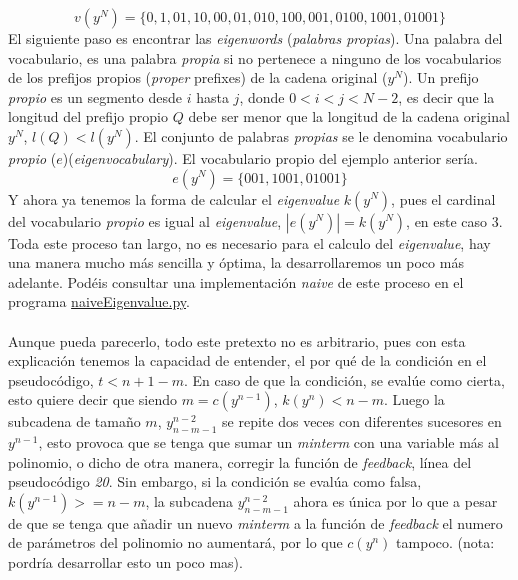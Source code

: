 \[v(y^{N}) = \{0, 1, 01, 10, 00, 01, 010, 100, 001, 0100, 1001, 01001 \}\]
El siguiente paso es encontrar las \textit{eigenwords} (\textit{palabras propias}). Una palabra del vocabulario, es una palabra \textit{propia} si no pertenece a ninguno de los vocabularios de los prefijos propios (\textit{proper} prefixes) de la cadena original ($y^{N}$). Un prefijo \textit{propio} es un segmento desde $i$ hasta $j$, donde $0 < i < j < N-2$, es decir que la longitud del prefijo propio $Q$ debe ser menor que la longitud de la cadena original $y^{N}$, $l(Q) < l(y^{N})$. El conjunto de palabras \textit{propias} se le denomina vocabulario \textit{propio} ($e$)(\textit{eigenvocabulary}). El vocabulario propio del ejemplo anterior sería.
\[e(y^{N}) = \{ 001, 1001, 01001 \}\]
Y ahora ya tenemos la forma de calcular el \textit{eigenvalue} $k(y^N)$, pues el cardinal del vocabulario \textit{propio} es igual al \textit{eigenvalue}, $|e(y^N)| = k(y^N)$, en este caso 3. Toda este proceso tan largo, no es necesario para el calculo del \textit{eigenvalue}, hay una manera mucho más sencilla y óptima, la desarrollaremos un poco más adelante. Podéis consultar una implementación \textit{naive} de este proceso en el programa \href{https://github.com/domingoUnican/TFGPedroCastro/blob/main/code/code_proofs/naive_eigenvalue.py}{naiveEigenvalue.py}.\\\\ Aunque pueda parecerlo, todo este pretexto no es arbitrario, pues con esta explicación tenemos la capacidad de entender, el por qué de la condición en el pseudocódigo, $t < n + 1 - m$. En caso de que la condición, se evalúe como cierta, esto quiere decir que siendo $m = c(y^{n-1})$, $k(y^n) < n - m$. Luego la subcadena de tamaño $m$, $y^{n-2}_{n-m-1}$ se repite dos veces con diferentes sucesores en $y^{n-1}$, esto provoca que se tenga que sumar un \textit{minterm} con una variable más al polinomio, o dicho de otra manera, corregir la función de \textit{feedback}, línea del pseudocódigo \textit{20}. Sin embargo, si la condición se evalúa como falsa, $k(y^{n-1}) >= n - m$, la subcadena $y^{n-2}_{n-m-1}$ ahora es única por lo que a pesar de que se tenga que añadir un nuevo \textit{minterm} a la función de \textit{feedback} el numero de parámetros del polinomio no aumentará, por lo que $c(y^n)$ tampoco. (nota: pordría desarrollar esto un poco mas).\\\\
